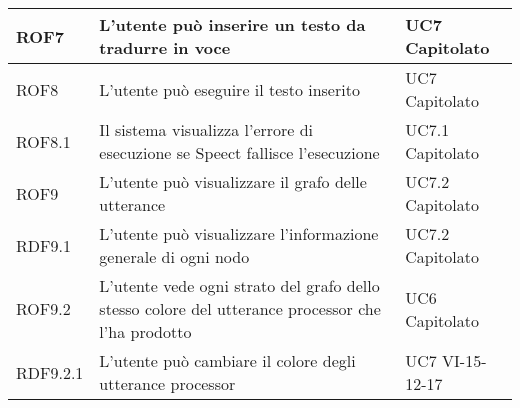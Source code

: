 \documentclass[../AnalisideiRequisiti.tex]{subfiles}
\begin{document}
\begin{longtable}{| p{3cm} | p{6cm} | p{3cm} |}
		\newline ROF7&
		\newline L'utente può inserire un testo da tradurre in voce&
		\newline UC7 \newline Capitolato
		\\[1em]
		
		\hline
		\newline ROF8&
		\newline L'utente può eseguire il testo inserito&
		\newline UC7 \newline Capitolato
		\\[1em]
		\hline
		\newline ROF8.1&
		\newline Il sistema visualizza l'errore di esecuzione se Speect fallisce l'esecuzione&
		\newline UC7.1 \newline Capitolato
		\\[1em]
		\hline
		
			\newline ROF9&
		\newline L'utente può visualizzare il grafo delle utterance&
		\newline UC7.2 \newline Capitolato
		\\[1em]
		\hline
		
			
		
			\newline RDF9.1&
		\newline L'utente può visualizzare l'informazione generale di ogni nodo&
		\newline UC7.2 \newline Capitolato
		\\[1em]
		\hline
		
		\newline ROF9.2&
		\newline L'utente vede ogni strato del grafo dello stesso colore del utterance processor che l'ha prodotto &
		\newline UC6 \newline Capitolato
		\\[1em]
		\hline
		
		\newline RDF9.2.1&
		\newline L'utente può cambiare il colore degli utterance processor&
		\newline UC7 \newline VI-15-12-17
		\\[1em]
		\hline
		

\end{longtable}
\end{document}
